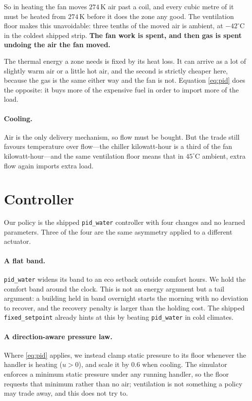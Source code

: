 \documentclass[10pt]{article}
\begin{document}
So in heating the fan moves $274$\,K air past a coil, and every cubic metre of
it must be heated from $274$\,K before it does the zone any good. The
ventilation floor makes this unavoidable: three tenths of the moved air is
ambient, at $-42^\circ$C in the coldest shipped strip. \textbf{The fan work is
spent, and then gas is spent undoing the air the fan moved.}

The thermal energy a zone needs is fixed by its heat loss. It can arrive as a
lot of slightly warm air or a little hot air, and the second is strictly cheaper
here, because the gas is the same either way and the fan is not. Equation
\eqref{eq:pid} does the opposite: it buys more of the expensive fuel in order to
import more of the load.

\paragraph{Cooling.} Air is the only delivery mechanism, so flow must be bought.
But the trade still favours temperature over flow---the chiller kilowatt-hour is
a third of the fan kilowatt-hour---and the same ventilation floor means that in
$45^\circ$C ambient, extra flow again imports extra load.

\section{Controller}

Our policy is the shipped \texttt{pid\_water} controller with four changes and
no learned parameters. Three of the four are the same asymmetry applied to a
different actuator.

\paragraph{A flat band.} \texttt{pid\_water} widens its band to an eco setback
outside comfort hours. We hold the comfort band around the clock. This is not
an energy argument but a tail argument: a building held in band overnight starts
the morning with no deviation to recover, and the recovery penalty is larger
than the holding cost. The shipped \texttt{fixed\_setpoint} already hints at
this by beating \texttt{pid\_water} in cold climates.

\paragraph{A direction-aware pressure law.} Where \eqref{eq:pid} applies, we
instead clamp static pressure to its floor whenever the handler is heating
($u>0$), and scale it by $0.6$ when cooling. The simulator enforces a minimum
static pressure under any running handler, so the floor requests that minimum
rather than no air; ventilation is not something a policy may trade away, and
this does not try to.
\end{document}
